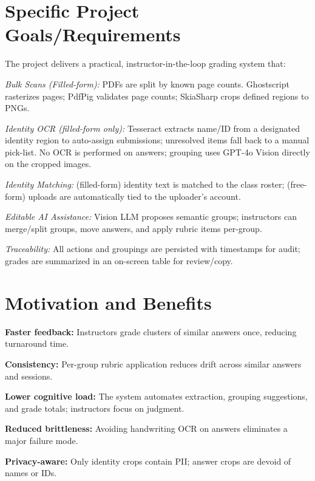\documentclass[ms,twoside,print]{nuthesis}
\begin{document}
\section{Specific Project Goals/Requirements}
The project delivers a practical, instructor-in-the-loop grading system that:
\begin{compactitem}
  \item \textit{Bulk Scans (Filled-form):} PDFs are split by known page counts. Ghostscript rasterizes pages; PdfPig validates page counts; SkiaSharp crops defined regions to PNGs.
  \item \textit{Identity OCR (filled-form only):} Tesseract extracts name/ID from a designated identity region to auto-assign submissions; unresolved items fall back to a manual pick-list. No OCR is performed on answers; grouping uses GPT-4o Vision directly on the cropped images.
  \item \textit{Identity Matching:} (filled-form) identity text is matched to the class roster; (free-form) uploads are automatically tied to the uploader's account.
  \item \textit{Editable AI Assistance:} Vision LLM proposes semantic groups; instructors can merge/split groups, move answers, and apply rubric items per-group.
  \item \textit{Traceability:} All actions and groupings are persisted with timestamps for audit; grades are summarized in an on-screen table for review/copy.
\end{compactitem}

\section{Motivation and Benefits}
\begin{compactitem}
  \item \textbf{Faster feedback:} Instructors grade clusters of similar answers once, reducing turnaround time.
  \item \textbf{Consistency:} Per-group rubric application reduces drift across similar answers and sessions.
  \item \textbf{Lower cognitive load:} The system automates extraction, grouping suggestions, and grade totals; instructors focus on judgment.
  \item \textbf{Reduced brittleness:} Avoiding handwriting OCR on answers eliminates a major failure mode.
  \item \textbf{Privacy-aware:} Only identity crops contain PII; answer crops are devoid of names or IDs.
\end{compactitem}
\end{document}
